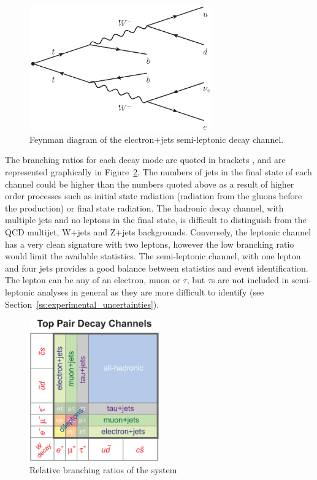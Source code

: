 \begin{figure}[hbtp]
   \centering
     \includegraphics[width=0.7\textwidth]{Chapters/03_Theory/Images/semileptonic_decay}\hfill
     \caption[Feynman diagram of the electron+jets semi-leptonic \ttbar decay channel.]{Feynman diagram of the
     electron+jets semi-leptonic \ttbar decay channel.}
     \label{fig:semileptonic_decay}
\end{figure}

The branching ratios for each decay mode are quoted in brackets \cite{Agashe:2014kda}, and are represented
graphically in Figure~\ref{fig:ttbar_branching_ratios}. The numbers of jets in the final state of each channel
could be higher than the numbers quoted above as a result of higher order processes such as initial state
radiation (radiation from the gluons before the \ttbar production) or final state radiation. The hadronic
decay channel, with multiple jets and no leptons in the final state, is difficult to distinguish from the QCD
multijet, W+jets and Z+jets backgrounds. Conversely, the leptonic channel has a very clean signature with two
leptons, however the low branching ratio would limit the available statistics. The semi-leptonic channel, with
one lepton and four jets provides a good balance between statistics and event identification. The lepton can
be any of an electron, muon or $\tau$, but $\tau$s are not included in semi-leptonic \tquark analyses in
general as they are more difficult to identify (see Section~\ref{ss:experimental_uncertainties}).

\begin{figure}[hbtp]
   \centering
     \includegraphics[width=0.5\textwidth]{Chapters/03_Theory/Images/top_pair_decay_channels}\hfill
     \caption[Relative branching ratios of the \ttbar system]{Relative branching ratios of the \ttbar system}
     \label{fig:ttbar_branching_ratios}
\end{figure}

